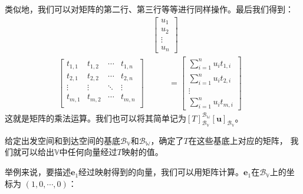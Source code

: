 \documentclass[12pt,UTF8,fontset=none]{ctexbook}
\begin{document}
类似地，我们可以对矩阵的第二行、第三行等等进行同样操作。最后我们得到：
\begin{align*}
&  \begin{bmatrix}u_1\\u_2\\ \vdots \\u_n \end{bmatrix} &  \\
    \begin{bmatrix}
        t_{1,1}    & t_{1,2}   & \cdots & t_{1,n} \\
        t_{2,1}    & t_{2,2}   & \cdots & t_{2,n} \\
        \vdots     & \vdots    & \ddots & \vdots  \\
        t_{m,1}    & t_{m,2}   & \cdots & t_{m,n} \\
       \end{bmatrix} \,& \quad\quad = \begin{bmatrix}\sum_{i=1}^n u_i t_{1,i}\\\sum_{i=1}^n u_i t_{2,i}\\ \vdots \\\sum_{i=1}^n u_i t_{m,i} \end{bmatrix} 
\end{align*}
这就是矩阵的乘法运算。我们也可以将其简单记为$[T]_{\mathcal{B}_{\mathbb{V}}}^{\mathcal{B}_{\mathbb{W}}}[\mathbf{u}]_{\mathcal{B}_{\mathbb{V}}}$。

给定出发空间和到达空间的基底$\mathcal{B}_{\mathbb{V}}$和$\mathcal{B}_{\mathbb{W}}$，确定了$T$在这些基底上对应的矩阵，
我们就可以给出$\mathbb{V}$中任何向量经过$T$映射的值。

举例来说，要描述$\mathbf{e}_1$经过映射得到的向量，我们可以用矩阵计算。$\mathbf{e}_1$在$\mathcal{B}_{\mathbb{V}}$上的坐标为
$(1, 0, \cdots, 0)$：
\end{document}
